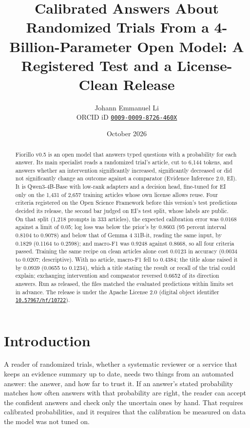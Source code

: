 \documentclass[11pt,letterpaper]{article}
\title{Calibrated Answers About Randomized Trials From a 4-Billion-Parameter Open Model: A Registered Test and a License-Clean Release}
\author{Johann Emmanuel Li\\[2pt]
\small ORCID iD \href{https://orcid.org/0009-0009-8726-460X}{\nolinkurl{0009-0009-8726-460X}}}
\date{October 2026}
\newcommand{\doi}[1]{\href{https://doi.org/#1}{\nolinkurl{#1}}}
\begin{document}
\maketitle

\begin{abstract}
\noindent Fiorillo v0.5 is an open model that answers typed questions with a probability for each answer. Its main specialist reads a randomized trial's article, cut to 6,144 tokens, and answers whether an intervention significantly increased, significantly decreased or did not significantly change an outcome against a comparator (Evidence Inference 2.0, EI). It is Qwen3-4B-Base with low-rank adapters and a decision head, fine-tuned for EI only on the 1,431 of 2,657 training articles whose own license allows reuse. Four criteria registered on the Open Science Framework before this version's test predictions decided its release, the second bar judged on EI's test split, whose labels are public. On that split (1,218 prompts in 333 articles), the expected calibration error was 0.0168 against a limit of 0.05; log loss was below the prior's by 0.8603 (95 percent interval 0.8104 to 0.9078) and below that of Gemma 4 31B-it, reading the same input, by 0.1829 (0.1164 to 0.2598); and macro-F1 was 0.9248 against 0.8668, so all four criteria passed. Training the same recipe on clean articles alone cost 0.0123 in accuracy (0.0034 to 0.0207; descriptive). With no article, macro-F1 fell to 0.4384; the title alone raised it by 0.0939 (0.0655 to 0.1234), which a title stating the result or recall of the trial could explain; exchanging intervention and comparator reversed 0.6652 of its direction answers. Run as released, the files matched the evaluated predictions within limits set in advance. The release is under the Apache License 2.0 (digital object identifier \doi{10.57967/hf/10722}).
\end{abstract}

\section{Introduction}
\label{sec:intro}

A reader of randomized trials, whether a systematic reviewer or a service that keeps an evidence summary up to date, needs two things from an automated answer: the answer, and how far to trust it. If an answer's stated probability matches how often answers with that probability are right, the reader can accept the confident answers and check only the uncertain ones by hand. That requires calibrated probabilities, and it requires that the calibration be measured on data the model was not tuned on.
\end{document}
